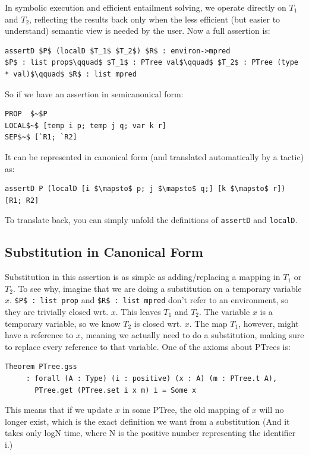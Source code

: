 \documentclass{puthesis}
\begin{document}
In symbolic execution and efficient entailment
solving, we operate directly on $T_1$ and $T_2$, reflecting the
results back only when the less efficient (but easier to understand)
semantic view is needed by the user. 
Now a full assertion is:

\begin{lstlisting}
assertD $P$ (localD $T_1$ $T_2$) $R$ : environ->mpred
$P$ : list prop$\qquad$ $T_1$ : PTree val$\qquad$ $T_2$ : PTree (type * val)$\qquad$ $R$ : list mpred
\end{lstlisting}

So if we have an assertion in semicanonical form:

\begin{lstlisting}
PROP  $~$P
LOCAL$~$ [temp i p; temp j q; var k r]
SEP$~$ [`R1; `R2]
\end{lstlisting}

It can be represented in canonical form (and translated automatically
by a tactic) as:

\begin{lstlisting}
assertD P (localD [i $\mapsto$ p; j $\mapsto$ q;] [k $\mapsto$ r]) [R1; R2]
\end{lstlisting}

To translate back, you can simply unfold the definitions of \lstinline|assertD|
and \lstinline|localD|.

\subsection{Substitution in Canonical Form}
\label{sec:subst_canon}
Substitution in this assertion is as simple as adding/replacing a
mapping in $T_1$ or $T_2$. To see why, imagine that we are doing a
substitution on a temporary variable $x$.  \lstinline|$P$ : list prop|
and \lstinline|$R$ : list mpred| don't refer to an environment, so
they are trivially closed wrt.  $x$. This leaves $T_1$ and $T_2$. The
variable $x$ is a temporary variable, so we know $T_2$ is closed
wrt. $x$.  The map $T_1$, however, might have a reference to $x$,
meaning we actually need to do a substitution, making sure to replace
every reference to that variable. One of the axioms about PTrees
is:

\begin{lstlisting}
Theorem PTree.gss
     : forall (A : Type) (i : positive) (x : A) (m : PTree.t A),
       PTree.get (PTree.set i x m) i = Some x
\end{lstlisting}

This means that if we update $x$ in some PTree, the old mapping of $x$
will no longer exist, which is the exact definition we want from a
substitution (And it takes only logN time, where N is the positive
number representing the identifier i.)
\end{document}
